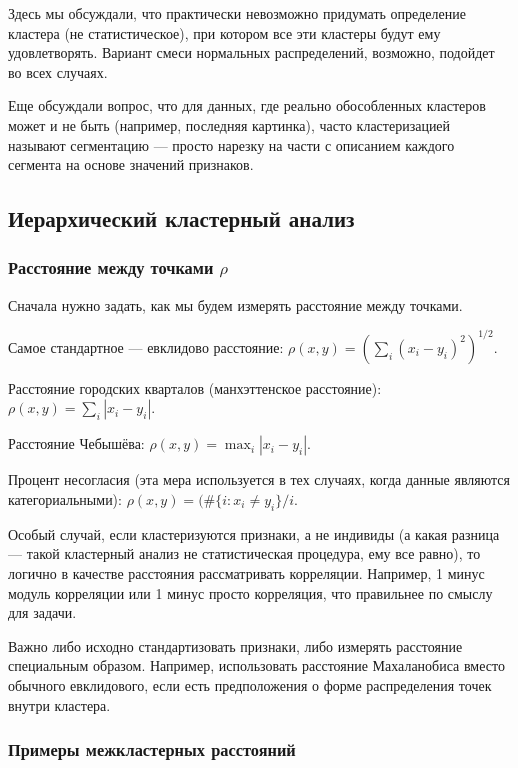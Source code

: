 Здесь мы обсуждали, что практически невозможно придумать определение кластера (не статистическое), при котором
все эти кластеры будут ему удовлетворять. Вариант смеси нормальных распределений, возможно, подойдет во всех случаях.

Еще обсуждали вопрос, что для данных, где реально обособленных кластеров может и не быть (например, последняя картинка),
часто кластеризацией называют сегментацию --- просто нарезку на части с описанием каждого сегмента на основе значений
признаков.

\subsection{Иерархический кластерный анализ}
\subsubsection{Расстояние между точками $\rho$}

Сначала нужно задать, как мы будем измерять расстояние между точками.

Самое стандартное --- евклидово расстояние: $\rho(x,y) = (\sum_i (x_i - y_i)^2 )^{1/2}$.

Расстояние городских кварталов (манхэттенское расстояние):  $\rho(x,y) = \sum_i |x_i - y_i|$.

Расстояние Чебышёва: $\rho(x,y) = \max_i |x_i - y_i|$.

Процент несогласия (эта мера используется в тех случаях, когда данные являются категориальными):
$\rho(x,y) = (\#\{i: x_i\neq y_i\}/ i$.

Особый случай, если кластеризуются признаки, а не индивиды (а какая разница --- такой кластерный анализ не статистическая процедура,
ему все равно), то логично в качестве расстояния рассматривать корреляции. Например, 1 минус модуль корреляции или
1 минус просто корреляция, что правильнее по смыслу для задачи.

\begin{note}
 Важно либо исходно стандартизовать признаки, либо измерять расстояние
специальным образом. Например, использовать расстояние Махаланобиса вместо обычного евклидового, если есть предположения о форме распределения точек внутри кластера.
\end{note}

\subsubsection{Примеры межкластерных расстояний}

